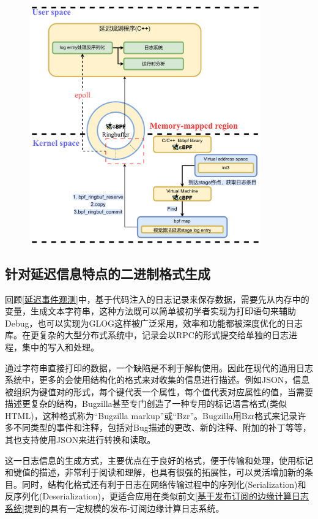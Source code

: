 \documentclass[master]{shtthesis}
\begin{document}
\begin{figure}[htbp]
	\centering
	\includegraphics[width=10cm]{img/log.pdf}
	\label{延迟日志向用户态提交的实现}
\end{figure}


\subsection{针对延迟信息特点的二进制格式生成}

回顾\ref{延迟事件观测}中，基于代码注入的日志记录来保存数据，需要先从内存中的变量，生成文本字符串，这种方法既可以简单被初学者实现为打印语句来辅助Debug，也可以实现为GLOG\cite{toubiana2011analysis}这样被广泛采用，效率和功能都被深度优化的日志库。在更复杂的大型分布式系统中，记录会以RPC的形式提交给单独的日志进程，集中的写入和处理。

通过字符串直接打印的数据，一个缺陷是不利于解构使用。因此在现代的通用日志系统中，更多的会使用结构化的格式来对收集的信息进行描述。例如JSON，信息被组织为键值对的形式，每个键代表一个属性，每个值代表对应属性的值，当需要描述更复杂的结构，Bugzilla\cite{serrano2005bugzilla}甚至专门创造了一种专用的标记语言格式(类似HTML)，这种格式称为“Bugzilla markup”或“Bzr”。Bugzilla用Bzr格式来记录许多不同类型的事件和注释，包括对Bug描述的更改、新的注释、附加的补丁等等，其也支持使用JSON来进行转换和读取。

这一日志信息的生成方式，主要优点在于良好的格式，便于传输和处理，使用标记和键值的描述，非常利于阅读和理解，也具有很强的拓展性，可以灵活增加新的条目。同时，结构化格式还有利于日志在网络传输过程中的序列化(Serialization)和反序列化(Deserialization)，更适合应用在类似前文\ref{基于发布订阅的边缘计算日志系统}提到的具有一定规模的发布-订阅边缘计算日志系统。
\end{document}
